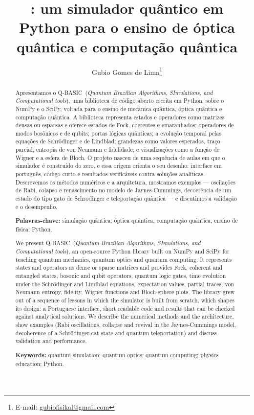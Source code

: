 \documentclass[11pt,a4paper]{article}
\title{\qbasic: um simulador quântico em Python para o ensino de óptica quântica
e computação quântica}
\author{Gubio Gomes de Lima\thanks{E-mail: \href{mailto:gubiofisikal@gmail.com}{gubiofisikal@gmail.com}}}
\date{}
\newcommand{\qbasic}{\textsc{Q-BASIC}}
\begin{document}
\maketitle

\begin{abstract}
\noindent
Apresentamos o \qbasic\ (\emph{Quantum Brazilian Algorithms, SImulations, and
Computational tools}), uma biblioteca de código aberto escrita em Python, sobre o NumPy e
o SciPy, voltada para o ensino de mecânica quântica, óptica quântica e computação
quântica. A biblioteca representa estados e operadores como matrizes densas ou esparsas e
oferece estados de Fock, coerentes e emaranhados; operadores de modos bosônicos e de
qubits; portas lógicas quânticas; a evolução temporal pelas equações de Schrödinger e de
Lindblad; grandezas como valores esperados, traço parcial, entropia de von Neumann e
fidelidade; e visualizações como a função de Wigner e a esfera de Bloch. O projeto nasceu
de uma sequência de aulas em que o simulador é construído do zero, e essa origem orienta
o seu desenho: interface em português, código curto e resultados verificáveis contra
soluções analíticas. Descrevemos os métodos numéricos e a arquitetura, mostramos
exemplos --- oscilações de Rabi, colapso e renascimento no modelo de Jaynes-Cummings,
decoerência de um estado do tipo gato de Schrödinger e teleportação quântica --- e
discutimos a validação e o desempenho.

\medskip
\noindent\textbf{Palavras-chave:} simulação quântica; óptica quântica; computação
quântica; ensino de física; Python.
\end{abstract}

\begin{otherlanguage}{english}
\begin{abstract}
\noindent
We present \qbasic\ (\emph{Quantum Brazilian Algorithms, SImulations, and Computational
tools}), an open-source Python library built on NumPy and SciPy for teaching quantum
mechanics, quantum optics and quantum computing. It represents states and operators as
dense or sparse matrices and provides Fock, coherent and entangled states, bosonic and
qubit operators, quantum logic gates, time evolution under the Schrödinger and Lindblad
equations, expectation values, partial traces, von Neumann entropy, fidelity, Wigner
functions and Bloch-sphere plots. The library grew out of a sequence of lessons in which
the simulator is built from scratch, which shapes its design: a Portuguese interface,
short readable code and results that can be checked against analytical solutions. We
describe the numerical methods and the architecture, show examples (Rabi oscillations,
collapse and revival in the Jaynes-Cummings model, decoherence of a Schrödinger-cat state
and quantum teleportation) and discuss validation and performance.

\medskip
\noindent\textbf{Keywords:} quantum simulation; quantum optics; quantum computing;
physics education; Python.
\end{abstract}
\end{otherlanguage}
\end{document}
